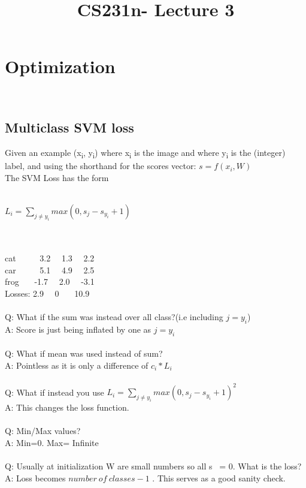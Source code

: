\documentclass{article}
\begin{document}
\title{CS231n- Lecture 3}
\maketitle
\section{Optimization}
\ \subsection{Multiclass SVM loss}
Given an example (x\textsubscript{i}, y\textsubscript{i})
where x\textsubscript{i} is the image and where y\textsubscript{i} is the (integer) label, and using the shorthand for the scores vector: $s = f(x_i, W)$\\The SVM Loss has the form\\\\
\centerline{$L_i = \sum_{j \neq y_i} max(0,s_j - s_{y_i} +1)$} \\
\\
cat	\ \ \  \ \	3.2	\ \	1.3	\ \	2.2\\
car	\ \ \	\ \ 5.1	\ \ 	4.9	\ \	2.5\\
frog 	\ \  \ 	-1.7	\ \	2.0	\ \	-3.1\\
Losses:	2.9	\ \	 0	\ \ \	 10.9 \\\\
Q: What if the sum was instead over all class?(i.e including $j = y_i$)\\
A: Score is just being inflated by one as $j = y_i$\\
\\
Q: What if mean was used instead of sum?\\
A: Pointless as it is only a difference of $c_i * L_i$ \\\\
Q: What if instead you use $L_i = \sum_{j \neq y_i} max(0,s_j - s_{y_i} +1)^{2}$ \\
A: This changes the loss function.\\\\
Q: Min/Max values?\\
A: Min=0. Max= Infinite\\\\
Q: Usually at initialization W are small numbers so all s ~= 0. What is the loss?\\
A: Loss becomes $number \ of \ classes - 1$ . This serves as a good sanity check.\\\\
\end{document}
